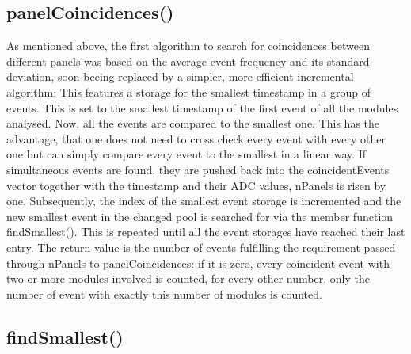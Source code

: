     \subsection{panelCoincidences()}
    \label{ch:Analysis software:sec:methods of the class run:subsec:panelCoincidences()}

    As mentioned above, the first algorithm to search for coincidences between different panels was based on the average event frequency and its standard deviation, soon beeing replaced by a simpler, more efficient incremental algorithm:
    This features a storage for the smallest timestamp in a group of events.  This is set to the smallest timestamp of the first event of all the modules analysed. Now, all the events are compared to the smallest one. This has the advantage, that one does not need to cross check every event with every other one but can simply compare every event to the smallest in a linear way. If simultaneous events are found, they are pushed back into the coincidentEvents vector together with the timestamp and their ADC values, nPanels is risen by one. Subsequently, the index of the smallest event storage is incremented and the new smallest event in the changed pool is searched for via the member function findSmallest(). This is repeated until all the event storages have reached their last entry.
    The return value is the number of events fulfilling the requirement passed through nPanels to panelCoincidences: if it is zero, every coincident event with two or more modules involved is counted, for every other number, only the number of event with exactly this number of modules is counted.

    \subsection{findSmallest()}
    \label{ch:Analysis software:sec:methods of the class run:subsec:findSmallest()}
    
    

